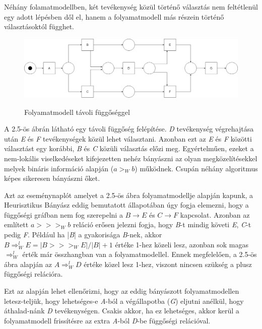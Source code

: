 Néhány folamatmodellben, két tevékenység közül történő választás nem feltétlenül egy adott lépésben dől el, hanem a folyamatmodell más részein történő választásoktól függhet.

\begin{figure}[h!]
\begin{center}
\includegraphics[width=\textwidth,keepaspectratio=true]{images/img_heuristic_longdistance}
\label{fig:plan}
\end{center}
\caption{Folyamatmodell távoli függőséggel}
\end{figure}

A 2.5-ös ábrán látható egy távoli függőség felépítése. \textit{D} tevékenység végrehajtása után \textit{E} és \textit{F} tevékenységek közül lehet választani. Azonban ezt az \textit{E} és \textit{F} közötti választást egy korábbi, \textit{B} és \textit{C} közüli választás előzi meg. Egyértelműen, ezeket a nem-lokális viselkedéseket kifejezetten nehéz bányászni az olyan megközelítésekkel melyek bináris információ alapján ($a>_Wb$) működnek. Csupán néhány algoritmus képes sikeresen bányászni őket.

Azt az eseménynaplót amelyet a 2.5-ös ábra folyamatmodellje alapján kapunk, a Heurisztikus Bányász eddig bemutatott állapotában úgy fogja elemezni, hogy a függőségi gráfban nem fog szerepelni a $B\rightarrow E$ és $C\rightarrow F$ kapcsolat. Azonban az említett $a>>>_Wb$ reláció erősen jelezni fogja, hogy \textit{B}-t mindig követi \textit{E}, \textit{C}-t pedig \textit{F}. Például ha |\textit{B}| a gyakorisága \textit{B}-nek, akkor $B\Rightarrow_W^l E = |B >>>_WE|/|B|+1$ értéke 1-hez közeli lesz, azonban sok magas $\Rightarrow_W^l $ érték már összhangban van a folyamatmodellel. Ennek megfelelően, a 2.5-ös ábra alapján az $A\Rightarrow_W^lD$ értéke közel lesz 1-hez, viszont nincsen szükség a plusz függőségi relációra.

Ezt az alapján lehet ellenőrizni, hogy az eddig bányászott folyamatmodellen letesz\hyp{}teljük, hogy lehetséges-e \textit{A}-ból a végállapotba (\textit{G}) eljutni anélkül, hogy áthalad\hyp{}nánk \textit{D} tevékenységen. Csakis akkor, ha ez lehetséges, akkor kerül a folyamatmodell frissítésre az extra \textit{A}-ból \textit{D}-be függőségi relációval.

